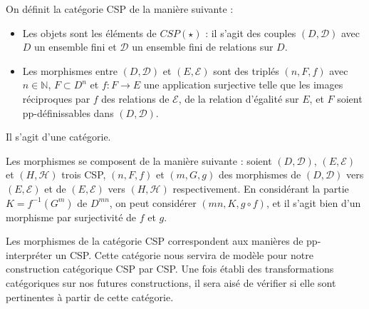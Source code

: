 \begin{defi}{}\label{catCSP}
    On définit la catégorie CSP de la manière suivante :
    \begin{itemize}
        \item Les objets sont les éléments de $CSP(\star)$ : il s'agit des couples
            $(D,\mathcal{D})$ avec $D$ un ensemble fini et $\mathcal{D}$ un
            ensemble fini de relations sur $D$.
        \item Les morphismes entre  $(D,\mathcal{D})$ et  $(E,\mathcal{E})$ sont
            des triplés $(n,F,f)$ avec $n \in \mathbb{N}$, $F \subset D^n$ et $f :
            F \rightarrow E$ une application surjective telle que les images
            réciproques par $f$ des relations de $\mathcal{E}$, de la relation
            d'égalité sur $E$, et $F$ soient pp-définissables dans
            $(D,\mathcal{D})$.
    \end{itemize}
    Il s'agit d'une catégorie.
\end{defi}


\begin{pv}
    Les morphismes se composent de la manière suivante : soient $(D,\mathcal{D})$,
    $(E,\mathcal{E})$ et $(H,\mathcal{H})$ trois CSP, $(n,F,f)$ et $(m,G,g)$
    des morphismes de $(D,\mathcal{D})$ vers $(E,\mathcal{E})$ et de
    $(E,\mathcal{E})$ vers $(H,\mathcal{H})$ respectivement. En considérant la
    partie $K = f^{-1}(G^m)$ de $D^{mn}$, on peut considérer $(mn,K,g \circ
    f)$, et il s'agit bien d'un morphisme par surjectivité de $f$ et $g$.
\end{pv}

Les morphismes de la catégorie CSP correspondent aux manières de pp-interpréter
un CSP.  Cette catégorie nous servira de modèle pour notre construction
catégorique CSP par CSP. Une fois établi des transformations catégoriques sur
nos futures constructions, il sera aisé de vérifier si elle sont pertinentes à
partir de cette catégorie.

